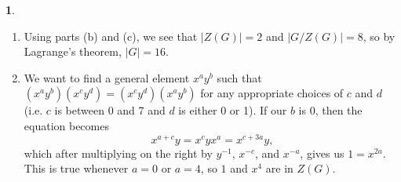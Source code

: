\documentclass[12pt]{article}
\theoremstyle{definition}
\newtheorem{ex}{}
\newenvironment{exercise}[1]{
	\renewcommand{\theex}{#1}
	\begin{ex}
		}{\end{ex}}
\begin{document}
\begin{exercise}{8}\
	\begin{enumerate}[label=(\alph*)]
		\item Using parts (b) and (c), we see that $|Z(G)| = 2$ and $|G/Z(G)| = 8$, so by Lagrange's theorem, $|G| = 16$.
		\item We want to find a general element $x^ay^b$ such that $(x^ay^b)(x^cy^d) = (x^cy^d)(x^ay^b)$ for any appropriate choices of $c$ and $d$ (i.e. $c$ is between 0 and 7 and $d$ is either 0 or 1).
		      If our $b$ is 0, then the equation becomes \begin{equation*}
			      x^{a+c}y = x^cyx^a = x^{c + 3a}y,
		      \end{equation*}
		      which after multiplying on the right by $y^{-1}$, $x^{-c}$, and $x^{-a}$, gives us $1 = x^{2a}$.
		      This is true whenever $a = 0$ or $a = 4$, so $1$ and $x^4$ are in $Z(G)$.


\end{enumerate}
\end{exercise}
\end{document}
